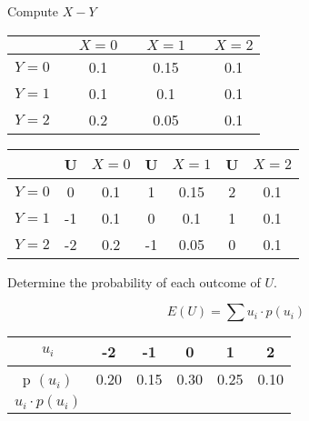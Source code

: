\documentclass[a4paper,12pt]{article}
\begin{document}



\noindent Compute $X-Y$
\begin{center}
\begin{tabular}{|c|cc|cc|cc|}
\hline  & \phantom{space}&$X=0$ &\phantom{space} & $X=1$ & \phantom{space}& $X=2$ \\ 
\hline $Y=0$& & 0.1 & & 0.15 & & 0.1 \\ 
\hline $Y=1$& & 0.1 & & 0.1 & & 0.1 \\ 
\hline $Y=2$& & 0.2 & & 0.05 & & 0.1 \\ 
\hline 
\end{tabular} 
\end{center}

\begin{center}
\begin{tabular}{|c|cc|cc|cc|}
\hline  & \phantom{sp}U \phantom{s}&$X=0$ &\phantom{sp}U \phantom{s} & $X=1$ & \phantom{sp}U\phantom{s}& $X=2$ \\ 
\hline $Y=0$& 0 & 0.1 & 1 & 0.15 & 2& 0.1 \\ 
\hline $Y=1$& -1& 0.1 & 0& 0.1 & 1& 0.1 \\ 
\hline $Y=2$& -2 & 0.2 & -1 & 0.05 & 0 & 0.1 \\ 
\hline 
\end{tabular} 
\end{center}


Determine the probability of each outcome of $U$.





\[ E(U) =  \sum  u_i \cdot p(u_i)   \]
\begin{center}
\begin{tabular}{|c|c|c|c|c|c|}
\hline $u_i$ & -2 & -1  & 0 & 1 & 2 \\ 
\hline p $(u_i)$ & \phantom{s}0.20\phantom{s} & \phantom{s}0.15\phantom{s}  & \phantom{s}0.30\phantom{s}  & \phantom{s}0.25\phantom{s} & \phantom{s}0.10\phantom{s} \\ 
\hline 
$u_i \cdot p (u_i)$ & & & & & \\\hline
\end{tabular} 
\end{center}
\end{document}
